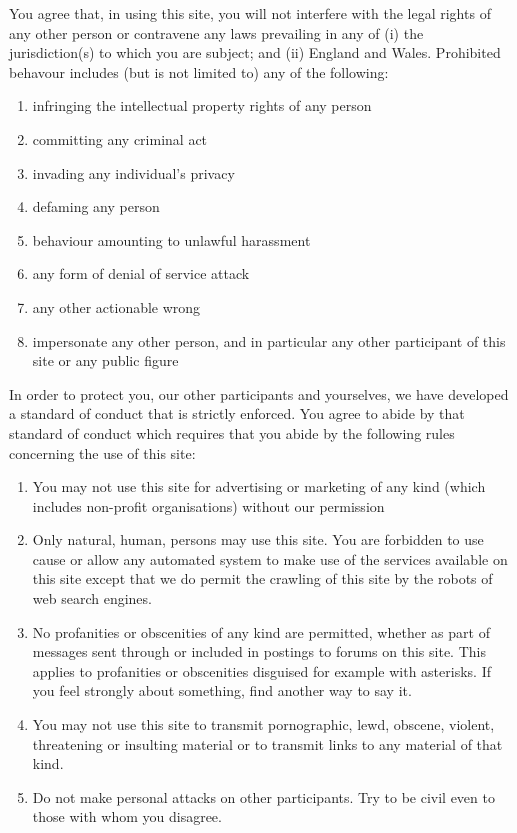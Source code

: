You agree that, in using this site, you will not interfere with the
legal rights of any other person or contravene any laws prevailing in
any of (i) the jurisdiction(s) to which you are subject; and (ii)
England and Wales. Prohibited behavour includes (but is not limited to)
any of the following:

\begin{enumerate}
\item
  infringing the intellectual property rights of any person
\item
  committing any criminal act
\item
  invading any individual's privacy
\item
  defaming any person
\item
  behaviour amounting to unlawful harassment
\item
  any form of denial of service attack
\item
  any other actionable wrong
\item
  impersonate any other person, and in particular any other participant
  of this site or any public figure
\end{enumerate}

In order to protect you, our other participants and yourselves, we have
developed a standard of conduct that is strictly enforced. You agree to
abide by that standard of conduct which requires that you abide by the
following rules concerning the use of this site:

\begin{enumerate}

\item
  You may not use this site for advertising or marketing of any kind
  (which includes non-profit organisations) without our permission
\item
  Only natural, human, persons may use this site. You are forbidden to
  use cause or allow any automated system to make use of the services
  available on this site except that we do permit the crawling of this
  site by the robots of web search engines.
\item
  No profanities or obscenities of any kind are permitted, whether as
  part of messages sent through or included in postings to forums on
  this site. This applies to profanities or obscenities disguised for
  example with asterisks. If you feel strongly about something, find
  another way to say it.
\item
  You may not use this site to transmit pornographic, lewd, obscene,
  violent, threatening or insulting material or to transmit links to any
  material of that kind.
\item
  Do not make personal attacks on other participants. Try to be civil
  even to those with whom you disagree.
\end{enumerate}

